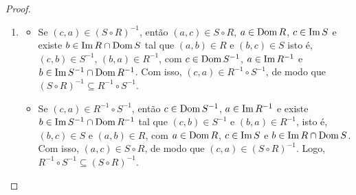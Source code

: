 \begin{proof}
\begin{enumerate}[leftmargin=*, align=left, label=\textbf{(\alph*)}]
\begin{itemize}
                    \item[($\subseteq$)] Se $(a,d) \in T \circ (S \circ R)$, então $a \in \Dom \, (S \circ R)$, $d \in \Img T$ e existe $c \in \Img \, (S \circ R) \cap \Dom T$ tal que $(a,c) \in S \circ R$ e $(c,d) \in T$. Como $(a,c) \in S \circ R$, temos $a \in \Dom R$, $c \in \Img S$ e existe $b \in \Img R \cap \Dom S$ tal que $(a,b) \in R$ e $(b,c) \in S$. Como $b \in \Dom S$, $d \in \Img T$ e existe $c \in \Dom T \cap \Img S$ tal que $(b,c) \in S$ e $(c,d) \in T$, temos que $(b,d) \in T \circ S$. Com isso, $b \in \Dom \, (T \circ S)$ e $d \in \Img \, (T \circ S)$. Como $a \in \Dom R$, $d \in \Img \, (T \circ S)$ e existe $b \in \Dom \, (T \circ S) \cap \Img R$ tal que $(a,b) \in R$ e $(b,d) \in T \circ S$, temos que $(a,d) \in (T \circ S) \circ R$. Com isso, $T \circ (S \circ R) \subseteq (T \circ S) \circ R$.
                    \item[($\supseteq$)] Se $(a,d) \in (T \circ S) \circ R$, então $a \in \Dom R$, $d \in \Img \, (T \circ S)$ e existe $b \in \Img R \cap \Dom \, (T \circ S)$ tal que $(a,b) \in R$ e $(b,d) \in T \circ S$. Como $(b,d) \in T \circ S$, temos $b \in \Dom S$, $d \in \Img T$ e existe $c \in \Img S \cap \Dom T$ tal que $(b,c) \in S$ e $(c,d) \in T$. Como $a \in \Dom R$, $c \in \Img S$ e existe $b \in \Img R \cap \Dom S$ tal que $(a,b) \in R$ e $(b,c) \in S$, temos que $(a,c) \in S \circ R$. Com isso, $a \in \Dom \, (S \circ R)$ e $c \in \Img \, (S \circ R)$. Como $a \in \Dom \, (S \circ R)$, $d \in \Img T$ e existe $c \in \Img \, (S \circ R) \cap \Dom T$ tal que $(a,c) \in S \circ R$ e $(c,d) \in T$, temos que $(a,d) \in T \circ (S \circ R)$. Com isso, $(T \circ S) \circ R \subseteq T \circ (S \circ R)$.
                \end{itemize}
            Logo, $T \circ (S \circ R) = (T \circ S) \circ R$. \blackproof
            \item
                \begin{itemize}
                    \item[($\subseteq$)] Se $(c,a) \in (S \circ R)^{-1}$, então $(a,c) \in S \circ R$, $a \in \Dom R$, $c \in \Img S$ e existe $b \in \Img R \cap \Dom S$ tal que $(a,b) \in R$ e $(b,c) \in S$ isto é, $(c,b) \in S^{-1}$, $(b,a) \in R^{-1}$, com $c \in \operatorname{Dom} S^{-1}$, $a \in \operatorname{Im} R^{-1}$ e $b \in \operatorname{Im} S^{-1} \cap \operatorname{Dom} R^{-1}$. Com isso, $(c,a) \in R^{-1} \circ S^{-1}$, de modo que $(S \circ R)^{-1} \subseteq R^{-1} \circ S^{-1}$.
                    \item[($\supseteq$)] Se $(c,a) \in R^{-1} \circ S^{-1}$, então $c \in \operatorname{Dom} S^{-1}$, $a \in \operatorname{Im} R^{-1}$ e existe $b \in \operatorname{Im} S^{-1} \cap \operatorname{Dom} R^{-1}$ tal que $(c,b) \in S^{-1}$ e $(b,a) \in R^{-1}$, isto é, $(b,c) \in S$ e $(a,b) \in R$, com $a \in \Dom R$, $c \in \Img S$ e $b \in \Img R \cap \Dom S$. Com isso, $(a,c) \in S \circ R$, de modo que $(c,a) \in (S \circ R)^{-1}$. Logo, $R^{-1} \circ S^{-1} \subseteq (S \circ R)^{-1}$.

\end{itemize}
\end{enumerate}
\end{proof}
